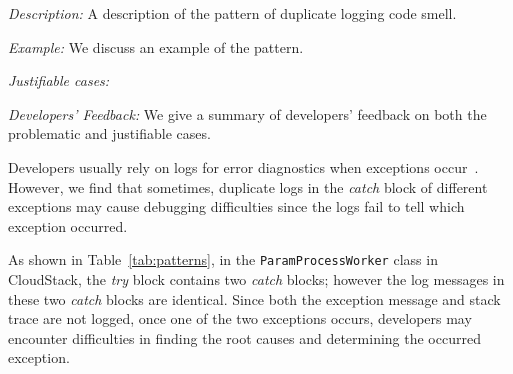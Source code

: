 \begin{LaTeXdescription}
  \item[{\em Description:}] A description of the pattern of duplicate logging code smell. 
  \item[{\em Example:}] We discuss an example of the pattern.
  \item[{\em Justifiable cases:}] 
  \item[{\em Developers' Feedback:}] We give a summary of developers' feedback on both the problematic and justifiable cases.

\end{LaTeXdescription}






Developers usually rely on logs for error diagnostics when exceptions occur~\cite{Yuan:2014:STP:2685048.2685068}. However, we find that sometimes, duplicate logs in the {\em catch} block of different exceptions may cause debugging difficulties since the logs fail to tell which exception occurred. 

As shown in Table~\ref{tab:patterns}, in the {\tt\small ParamProcessWorker} class in CloudStack, the {\em try} block contains two {\em catch} blocks; however the log messages in these two {\em catch} blocks are identical. Since both the exception message and stack trace are not logged, once one of the two exceptions occurs, developers may encounter difficulties in finding the root causes and determining the occurred exception. 

